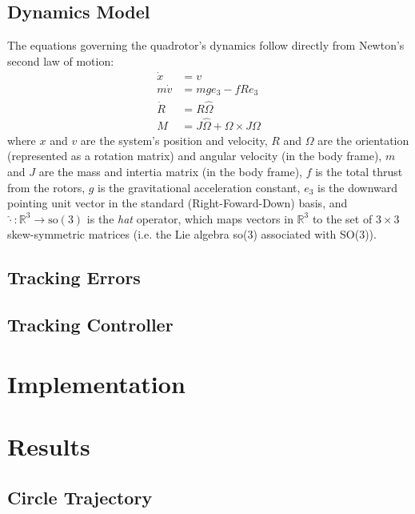 \documentclass[paper=letter, fontsize=11pt]{scrartcl} %
\numberwithin{equation}{section} %
\numberwithin{figure}{section} %
\numberwithin{table}{section} %
\begin{document}
\subsection{Dynamics Model}
The equations governing the quadrotor's dynamics follow directly from Newton's second law
of motion:
\begin{align}
\dot{x} &= v \\
m \dot{v} &= m g e_3 - f R e_3 \\
\dot{R} &= R \hat{\Omega} \\
M &= J \hat{\Omega} + \Omega \times J\Omega
\end{align}
where $x$ and $v$ are the system's position and velocity, $R$ and $\Omega$
are the orientation (represented as a rotation matrix) and angular velocity (in the 
body frame), $m$ and $J$ are the mass and intertia matrix (in the body frame), $f$ is the
total thrust from the rotors, $g$
is the gravitational acceleration constant, $e_3$ is the downward pointing unit vector
in the standard (Right-Foward-Down) basis, and $\hat{\cdot}: \mathbb{R}^3 \rightarrow \textrm{so}(3)$
is the \textit{hat} operator, which maps vectors in $\mathbb{R}^3$ to the set of $3 \times 3$
skew-symmetric matrices (i.e. the Lie algebra so(3) associated with SO(3)).

\subsection{Tracking Errors}
\subsection{Tracking Controller}

\section{Implementation}

\section{Results}
\subsection{Circle Trajectory}
\end{document}
